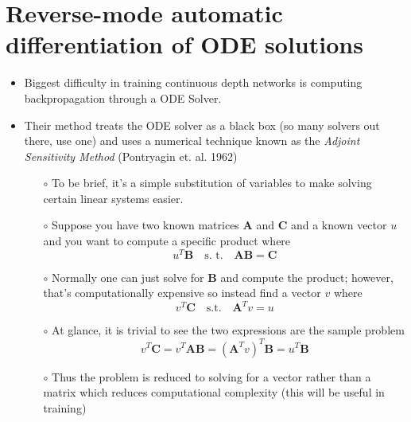 \documentclass[10pt,a4paper]{article}
\begin{document}
\newpage

\section{Reverse-mode automatic differentiation of ODE solutions}

\begin{itemize}
    \item Biggest difficulty in training continuous depth networks is computing backpropagation through a ODE Solver.
    \item Their method treats the ODE solver as a black box (so many solvers out there, use one) and uses a numerical technique known as the \textit{Adjoint Sensitivity Method} (Pontryagin et. al. 1962)
    \begin{itemize}
        \item[$\circ$]  To be brief, it's a simple substitution of variables to make solving certain linear systems easier.
        \item[$\circ$]  Suppose you have two known matrices $\textbf{A}$ and $\textbf{C}$ and a known vector $u$ and you want to compute a specific product where
        \begin{equation}
            u^{T}\textbf{B} \quad \textrm{s. t.} \quad 
            \textbf{AB} = \textbf{C}
        \end{equation}
        \item[$\circ$] Normally one can just solve for $\textbf{B}$ and compute the product; however, that's computationally expensive so instead find a vector $v$ where
        \begin{equation}
            v^{T}\textbf{C} \quad \textrm{s.t.} \quad \textbf{A}^{T}v = u
        \end{equation}
            \item[$\circ$] At glance, it is trivial to see the two expressions are the sample problem
    \begin{equation}
        v^{T}\textbf{C} = v^{T}\textbf{AB} = (\textbf{A}^{T}v)^{T}\textbf{B} = u^{T}\textbf{B}
    \end{equation}
    \item[$\circ$] Thus the problem is reduced to solving for a vector rather than a matrix which reduces computational complexity (this will be useful in training)
    \end{itemize}


\end{itemize}
\end{document}
